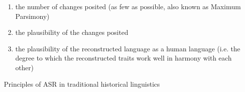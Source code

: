 \documentclass[12pt,letterpaper]{article}
\begin{document}
\begin{mylist}
\begin{enumerate}[label=(\roman*)]
\item the number of changes posited (as few as possible, also known as Maximum Parsimony)
\item the plausibility of the changes posited
\item the plausibility of the reconstructed language as a human language (i.e. the degree to which the reconstructed traits work well in harmony with each other)
\end{enumerate}
\caption{Principles of ASR in traditional historical linguistics}
\label{HL_principles_asr}
\end{mylist}



\end{document}
